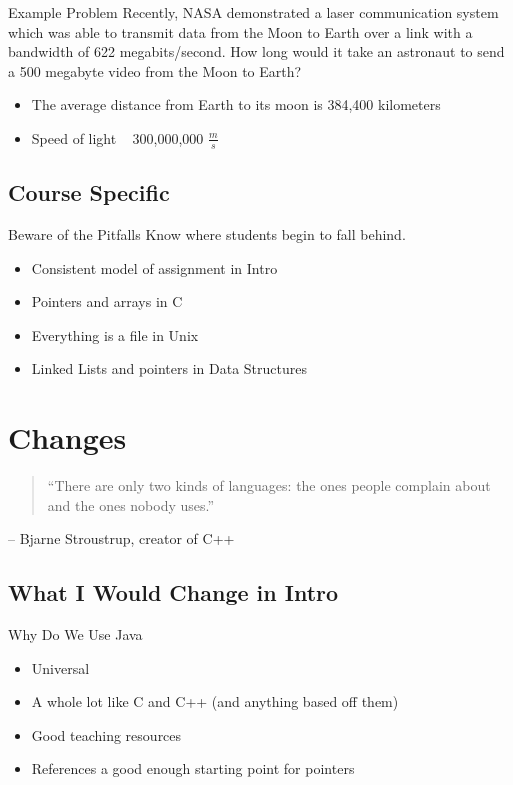 \documentclass[11pt]{beamer}
\begin{document}
\begin{frame}{Example Problem}
	Recently, NASA demonstrated a laser communication system which was able to transmit data from the Moon to Earth over a link with a bandwidth of 622 megabits/second.  How long would it take an astronaut to send a 500 megabyte video from the Moon to Earth?
	
	\begin{itemize}
		\item The average distance from Earth to its moon is 384,400 kilometers
		
		\item Speed of light ~ 300,000,000 $ \frac{m}{s} $
		
	\end{itemize}
\end{frame}

\subsection{Course Specific}


\begin{frame}{Beware of the Pitfalls}
	Know where students begin to fall behind.
	\begin{itemize}
		\item Consistent model of assignment in Intro
		\item Pointers and arrays in C
		\item Everything is a file in Unix
		\item Linked Lists and pointers in Data Structures
	\end{itemize}
\end{frame}
\section{Changes}

\begin{frame}
\begin{quotation}
	``There are only two kinds of languages: the ones people complain about and the ones nobody uses.''
\end{quotation}
-- Bjarne Stroustrup, creator of C++
\end{frame}


\subsection{What I Would Change in Intro}
\begin{frame}{Why Do We Use Java}
	\begin{itemize}
		\item Universal
		\item A whole lot like C and C++ (and anything based off them)
		\item Good teaching resources
		\item References a good enough starting point for pointers
	\end{itemize}
\end{frame}
\end{document}
